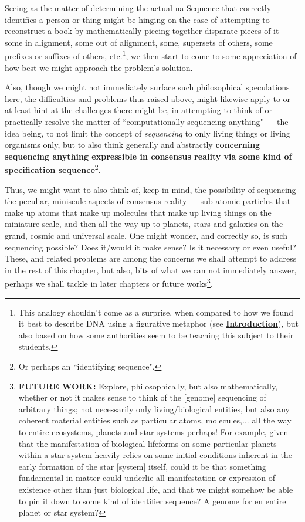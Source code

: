 \documentclass[a4paper, 18pt]{book} %
\begin{document}
Seeing as the matter of determining the actual na-Sequence that correctly identifies a person or thing might be hinging on the case of attempting to reconstruct a book by mathematically piecing together disparate pieces of it --- some in alignment, some out of alignment, some, supersets of  others, some prefixes or suffixes of others, etc.\footnote{This analogy shouldn't come as a surprise, when compared to how we found it best to describe DNA using a figurative metaphor (see \textbf{\hyperref[SEC1]{Introduction}}), but also based on how some authorities seem to be teaching this subject to their students\cite{przytycka_wgs_lecture10}.}, we then start to come to some appreciation of how best we might approach the problem's solution. 


Also, though we might not immediately surface such philosophical speculations here, the difficulties and problems thus raised above, might likewise apply to or at least hint at the challenges there might be, in attempting to think of or practically resolve the matter of ``computationally sequencing anything" --- the idea being, to not limit the concept of \textit{sequencing} to only living things or living organisms only, but to also think generally and abstractly \textbf{concerning sequencing anything expressible in consensus reality via some kind of specification sequence}\footnote{Or perhaps an ``identifying sequence".}. 


Thus, we might want to also think of, keep in mind, the possibility of sequencing the peculiar, miniscule aspects of consensus reality --- sub-atomic particles that make up atoms that make up molecules that make up living things on the miniature scale, and then all the way up to planets, stars and galaxies on the grand, cosmic and universal scale. One might wonder, and correctly so, is such sequencing possible? Does it/would it make sense? Is it necessary or even useful? These, and related problems are among the concerns we shall attempt to address in the rest of this chapter, but also, bits of what we can not immediately answer, perhaps we shall tackle in later chapters or future works\footnote{\textbf{FUTURE WORK:} Explore, philosophically, but also mathematically, whether or not it makes sense to think of the [genome] sequencing of arbitrary things; not necessarily only living/biological entities, but also any coherent material entities such as particular atoms, molecules,... all the way to entire ecosystems, planets and star-systems perhaps! For example, given that the manifestation of biological lifeforms on some particular planets within a star system heavily relies on some initial conditions inherent in the early formation of the star [system] itself, could it be that something fundamental in matter could underlie all manifestation or expression of existence other than just biological life, and that we might somehow be able to pin it down to some kind of identifier sequence? A genome for en entire planet or star system?}.
\end{document}
